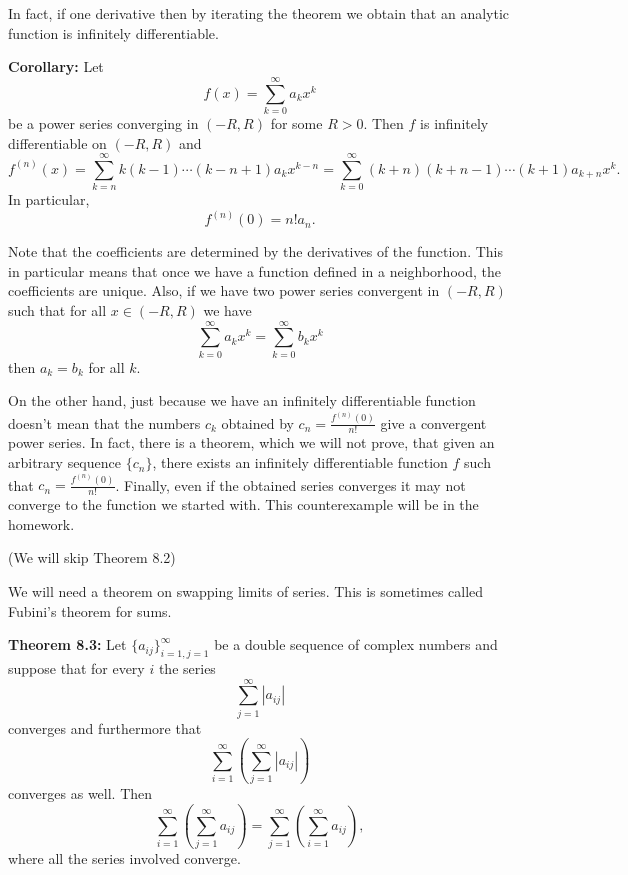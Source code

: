 \documentclass[12pt]{book}
\newcommand{\abs}[1]{\left\lvert {#1} \right\rvert}
\theoremstyle{plain}
\theoremstyle{remark}
\theoremstyle{definition}
\theoremstyle{exercise}
\theoremstyle{example}
\begin{document}
In fact, if one derivative then by iterating the theorem we obtain that an
analytic function is infinitely differentiable.

\medskip

\textbf{Corollary:}
Let
$$
f(x) = \sum_{k=0}^\infty a_k x^k
$$
be a power series converging in $(-R,R)$ for some $R > 0$.  Then $f$ is
infinitely differentiable on $(-R,R)$ and
$$
f^{(n)}(x) =
\sum_{k=n}^\infty k(k-1)\cdots(k-n+1)a_k x^{k-n}
=
\sum_{k=0}^\infty (k+n)(k+n-1)\cdots (k+1) a_{k+n} x^{k} .
$$
In particular,
$$
f^{(n)}(0) = n! a_n .
$$

\medskip

Note that the coefficients are determined by the derivatives of the
function.  This in particular means that once we have a function defined in
a neighborhood, the coefficients are unique.  Also, if we have two power
series convergent in $(-R,R)$ such that for all $x \in (-R,R)$ we have
$$
\sum_{k=0}^\infty a_k x^k
=
\sum_{k=0}^\infty b_k x^k
$$
then $a_k = b_k$ for all $k$.

\medskip

On the other hand, just because we have an infinitely differentiable
function doesn't mean that the numbers $c_k$ obtained by
$c_n = \frac{f^{(n)}(0)}{n!}$ give a convergent power series.  In fact,
there is a theorem, which we will not prove,
that given an arbitrary sequence $\{ c_n \}$, there exists an
infinitely differentiable function $f$ such that
$c_n = \frac{f^{(n)}(0)}{n!}$.  Finally, even if the obtained series
converges it may not converge to the function we started with.  This
counterexample will be in the homework.

\medskip

(We will skip Theorem 8.2)

\medskip

We will need a theorem on swapping limits of series.  This is sometimes
called Fubini's theorem for sums.

\medskip

\textbf{Theorem 8.3:}  Let $\{ a_{ij} \}_{i=1,j=1}^\infty$ be a double
sequence of complex numbers and suppose that for every $i$ the series
$$
\sum_{j=1}^\infty \abs{a_{ij}}
$$
converges and furthermore that
$$
\sum_{i=1}^\infty \left( \sum_{j=1}^\infty \abs{a_{ij}} \right)
$$
converges as well.  Then
$$
\sum_{i=1}^\infty \left( \sum_{j=1}^\infty a_{ij} \right)
=
\sum_{j=1}^\infty \left( \sum_{i=1}^\infty a_{ij} \right) ,
$$
where all the series involved converge.

\medskip
\end{document}
